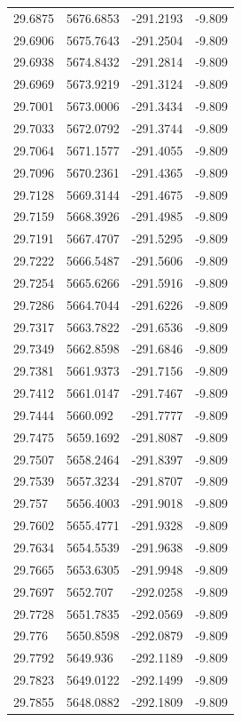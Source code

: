 \begin{table}[H]
\begin{tabular}{llll}
29.6875 & 5676.6853 & -291.2193 & -9.809 \\
29.6906 & 5675.7643 & -291.2504 & -9.809 \\
29.6938 & 5674.8432 & -291.2814 & -9.809 \\
29.6969 & 5673.9219 & -291.3124 & -9.809 \\
29.7001 & 5673.0006 & -291.3434 & -9.809 \\
29.7033 & 5672.0792 & -291.3744 & -9.809 \\
29.7064 & 5671.1577 & -291.4055 & -9.809 \\
29.7096 & 5670.2361 & -291.4365 & -9.809 \\
29.7128 & 5669.3144 & -291.4675 & -9.809 \\
29.7159 & 5668.3926 & -291.4985 & -9.809 \\
29.7191 & 5667.4707 & -291.5295 & -9.809 \\
29.7222 & 5666.5487 & -291.5606 & -9.809 \\
29.7254 & 5665.6266 & -291.5916 & -9.809 \\
29.7286 & 5664.7044 & -291.6226 & -9.809 \\
29.7317 & 5663.7822 & -291.6536 & -9.809 \\
29.7349 & 5662.8598 & -291.6846 & -9.809 \\
29.7381 & 5661.9373 & -291.7156 & -9.809 \\
29.7412 & 5661.0147 & -291.7467 & -9.809 \\
29.7444 & 5660.092 & -291.7777 & -9.809 \\
29.7475 & 5659.1692 & -291.8087 & -9.809 \\
29.7507 & 5658.2464 & -291.8397 & -9.809 \\
29.7539 & 5657.3234 & -291.8707 & -9.809 \\
29.757 & 5656.4003 & -291.9018 & -9.809 \\
29.7602 & 5655.4771 & -291.9328 & -9.809 \\
29.7634 & 5654.5539 & -291.9638 & -9.809 \\
29.7665 & 5653.6305 & -291.9948 & -9.809 \\
29.7697 & 5652.707 & -292.0258 & -9.809 \\
29.7728 & 5651.7835 & -292.0569 & -9.809 \\
29.776 & 5650.8598 & -292.0879 & -9.809 \\
29.7792 & 5649.936 & -292.1189 & -9.809 \\
29.7823 & 5649.0122 & -292.1499 & -9.809 \\
29.7855 & 5648.0882 & -292.1809 & -9.809 \\

\end{tabular}
\end{table}
